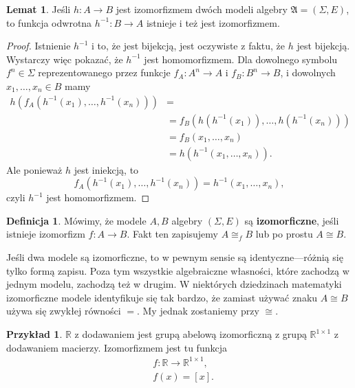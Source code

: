 \documentclass{article}
\theoremstyle{definition}
\newtheorem{definition}{Definicja}[section]
\newtheorem{example}{Przykład}[section]
\newtheorem{lemma}{Lemat}[section]
\begin{document}
\begin{lemma}
	Jeśli $h: A \to B$ jest izomorfizmem dwóch modeli algebry $\mathfrak{A} = (\Sigma, E)$,
		to funkcja odwrotna $h^{-1}: B \to A$ istnieje i też jest izomorfizmem.
\end{lemma}
\begin{proof}
	Istnienie $h^{-1}$ i to,
		że jest bijekcją,
		jest oczywiste z faktu,
		że $h$ jest bijekcją.
	Wystarczy więc pokazać,
		że $h^{-1}$ jest homomorfizmem.
	Dla dowolnego symbolu $f^n \in \Sigma$ reprezentowanego przez funkcje
		$f_A: A^n \to A$ i $f_B: B^n \to B$,
		i dowolnych $x_1, \dots, x_n \in B$ mamy
	\begin{align}
		h(f_A(h^{-1}(x_1), \dots, h^{-1}(x_n))) &= \\
			&= f_B(h(h^{-1}(x_1)), \dots, h(h^{-1}(x_n))) \\
			&= f_B(x_1, \dots, x_n) \\
			&= h(h^{-1}(x_1, \dots, x_n)).
	\end{align}
	Ale ponieważ $h$ jest iniekcją, to
	\begin{equation}
		f_A(h^{-1}(x_1), \dots, h^{-1}(x_n)) = h^{-1}(x_1, \dots, x_n),
	\end{equation}
	czyli $h^{-1}$ jest homomorfizmem.
\end{proof}

\begin{definition}
	Mówimy, że modele $A, B$ algebry $(\Sigma, E)$ są \textbf{izomorficzne},
		jeśli istnieje izomorfizm $f: A \to B$.
	Fakt ten zapisujemy $A \cong_f B$ lub po prostu $A \cong B$.
\end{definition}
Jeśli dwa modele są izomorficzne, to w pewnym sensie są identyczne---różnią się tylko formą zapisu.
Poza tym wszystkie algebraiczne własności,
	które zachodzą w jednym modelu,
	zachodzą też w drugim.
W niektórych dziedzinach matematyki izomorficzne modele identyfikuje się tak bardzo,
	że zamiast używać znaku $A \cong B$ używa się zwykłej równości $=$.
My jednak zostaniemy przy $\cong$.

\begin{example}
	$\mathbb{R}$ z dodawaniem jest grupą abelową izomorficzną z grupą $\mathbb{R}^{1 \times 1}$ z dodawaniem macierzy.
	Izomorfizmem jest tu funkcja
	\begin{align*}
		&f: \mathbb{R} \to \mathbb{R}^{1 \times 1},\\
		&f(x) = [x].
	\end{align*}
\end{example}
\end{document}
